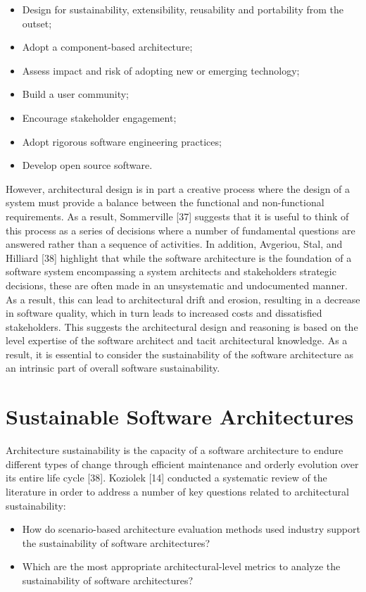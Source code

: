 \documentclass[preprint,12pt,authoryear]{elsarticle}
\begin{document}
\begin{itemize}
\item Design for sustainability, extensibility, reusability and
portability from the outset;
\item Adopt a component-based architecture;
\item Assess impact and risk of adopting new or emerging technology;
\item Build a user community;
\item Encourage stakeholder engagement;
\item Adopt rigorous software engineering practices;
\item Develop open source software.
\end{itemize}

However, architectural design is in part a creative process where the
design of a system must provide a balance between the functional and
non-functional requirements. As a result, Sommerville [37] suggests
that it is useful to think of this process as a series of decisions
where a number of fundamental questions are answered rather than a
sequence of activities. In addition, Avgeriou, Stal, and Hilliard [38]
highlight that while the software architecture is the foundation of a
software system encompassing a system architects and stakeholders
strategic decisions, these are often made in an unsystematic and
undocumented manner. As a result, this can lead to architectural drift
and erosion, resulting in a decrease in software quality, which in
turn leads to increased costs and dissatisfied stakeholders. This
suggests the architectural design and reasoning is based on the level
expertise of the software architect and tacit architectural
knowledge. As a result, it is essential to consider the sustainability
of the software architecture as an intrinsic part of overall software
sustainability.


\section{Sustainable Software Architectures}\label{sec:sustsoftarch}

Architecture sustainability is the capacity of a software architecture
to endure different types of change through efficient maintenance and
orderly evolution over its entire life cycle [38]. Koziolek [14]
conducted a systematic review of the literature in order to address a
number of key questions related to architectural sustainability:

\begin{itemize}
\item How do scenario-based architecture evaluation methods used
industry support the sustainability of software architectures?
\item Which are the most appropriate architectural-level metrics to
analyze the sustainability of software architectures?
\end{itemize}
\end{document}
